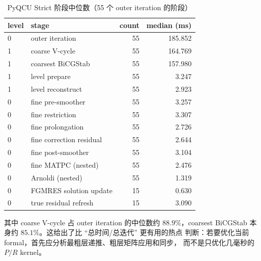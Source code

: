 \documentclass[UTF8,a4paper,11pt]{ctexart}
\begin{document}
\begin{table}[htbp]
\centering
\caption{PyQCU Strict 阶段中位数（55 个 outer iteration 的阶段）}
\small
\begin{tabular}{@{}llrr@{}}
\toprule
level & stage & count & median (ms) \\
\midrule
0 & outer iteration & 55 & 185.852 \\
1 & coarse V-cycle & 55 & 164.769 \\
1 & coarsest BiCGStab & 55 & 157.980 \\
1 & level prepare & 55 & 3.247 \\
1 & level reconstruct & 55 & 2.923 \\
0 & fine pre-smoother & 55 & 3.257 \\
0 & fine restriction & 55 & 3.307 \\
0 & fine prolongation & 55 & 2.726 \\
0 & fine correction residual & 55 & 2.644 \\
0 & fine post-smoother & 55 & 3.104 \\
0 & fine MATPC (nested) & 55 & 2.476 \\
0 & Arnoldi (nested) & 55 & 1.319 \\
0 & FGMRES solution update & 15 & 0.630 \\
0 & true residual refresh & 15 & 3.090 \\
\bottomrule
\end{tabular}
\end{table}

其中 coarse V-cycle 占 outer iteration 的中位数约 $88.9\%$，coarsest
BiCGStab 本身约 $85.1\%$。这给出了比 ``总时间/总迭代'' 更有用的热点
判断：若要优化当前 formal，首先应分析最粗层递推、粗层矩阵应用和同步，
而不是只优化几毫秒的 $P/R$ kernel。
\end{document}
